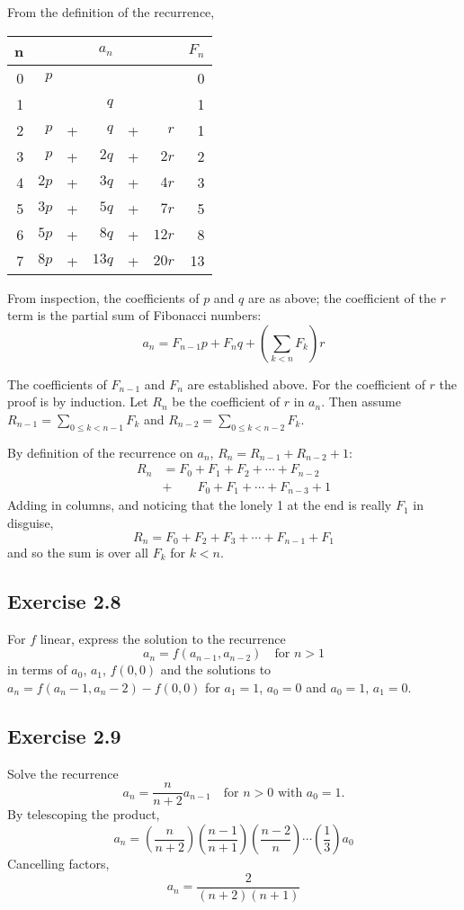 \documentclass[11pt, oneside]{article}   	%
\begin{document}
From the definition of the recurrence,

\begin{tabular}{r | r c r c r | r}
	n	& & & $a_n$ & & 				& $F_n$\\
	\hline
	0	&  $p$ & & & &						& 0 \\
	1	& & & $q$ & &						& 1 \\
	2	& $p$ & {}+{} & $q$ & {}+{} & $r$		& 1 \\
	3	& $p$ & {}+{} & $2q$ & {}+{} & $2r$ 		& 2\\
	4	& $2p$ & {}+{} & $3q$ & {}+{} & $4r$		& 3 \\
	5	& $3p$ & {}+{} & $5q$ & {}+{} & $7r$  	& 5 \\
	6	& $5p$ & {}+{} & $8q$ & {}+{} & $12r$	& 8 \\
	7	& $8p$ & {}+{} & $13q$ & {}+{} & $20r$	& 13

\end{tabular}

From inspection, the coefficients of $p$ and $q$ are as above; the coefficient of the $r$ term is the partial sum of Fibonacci numbers:
\[
	a_n = F_{n-1}p + F_n q + \left(\sum_{k<n} F_k \right) r
\]

The coefficients of $F_{n-1}$ and $F_n$ are established above.  For the coefficient of $r$ the proof is by induction. Let $R_n$ be the coefficient
of $r$ in $a_n$. Then assume $R_{n-1} = \sum_{0 \le k < n-1} F_k$ and $R_{n-2} = \sum_{0 \le k < n-2} F_k$.

By definition of the recurrence on $a_n$, $R_n = R_{n-1} + R_{n-2} + 1$:
\begin{align*}
	R_n &= F_0 + F_1 + F_2 + \cdots + F_{n-2}  \\
		&+ \qquad  F_0 + F_1 +  \cdots + F_{n-3} +  1
\end{align*}
Adding in columns, and noticing that the lonely 1 at the end is really $F_1$ in disguise,
\[
	R_n = F_0 + F_2 + F_3 + \cdots + F_{n-1} + F_1
\]
and so the sum is over all $F_k$ for $k < n$.

\subsection*{Exercise 2.8}
For $f$ linear, express the solution to the recurrence
\[
	a_n = f(a_{n-1}, a_{n-2}) \quad \text{for $n>1$}
\]
in terms of $a_0$, $a_1$, $f(0,0)$ and the solutions to $a_n = f(a_n-1, a_n-2) - f(0,0)$ for $a_1=1$, $a_0=0$ and $a_0=1$, $a_1=0$.

\subsection*{Exercise 2.9}
Solve the recurrence 
\[
	a_n = \frac{n}{n+2}a_{n-1} \quad \text{for $n>0$ with $a_0=1$.}
\]
By telescoping the product,
\[
	a_n = \left(\frac{n}{n+2}\right)  \left(\frac{n-1}{n+1}\right)  \left(\frac{n-2}{n}\right)  \cdots \left(\frac{1}{3}\right) a_0
\]
Cancelling factors,
\[
	a_n = \frac{2}{(n+2)(n+1)}
\]
\end{document}
